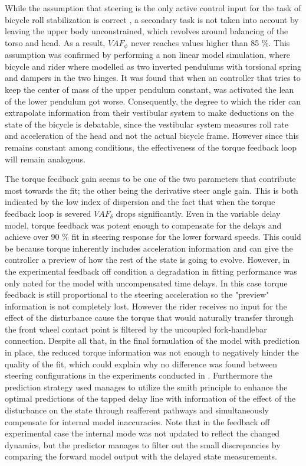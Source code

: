 While the assumption that steering is the only active control input for the task of bicycle roll stabilization is correct , a secondary task is not taken into account by leaving the upper body unconstrained, which revolves around balancing of the torso and head. As a result, \ensuremath{\mathit{VAF}_\phi} never reaches values higher than 85 \%. This assumption  was  confirmed by performing a non linear model simulation, where bicycle and rider where modelled as two inverted pendulums with torsional spring and dampers in the two hinges. It was found that when an  controller that tries to keep the center of mass of the upper pendulum constant, was activated the lean of the lower pendulum got worse. Consequently, the degree to which the rider can extrapolate information from their vestibular system to make deductions on the state of the bicycle is debatable, since the vestibular system measures roll rate and acceleration of the head and not the actual bicycle frame. However since this remains constant among conditions, the effectiveness of the torque feedback loop will remain analogous.

The torque feedback gain seems to be  one of the two  parameters that contribute most towards the fit; the other being the derivative steer angle gain. This is both indicated by the low index of dispersion and the fact that when the torque feedback loop is severed \ensuremath{\mathit{VAF}_\delta} drops significantly. Even in the variable delay model, torque feedback was potent enough to compensate for the delays and achieve over 90 \% fit in steering response for the lower forward speeds. This could be because torque inherently includes acceleration information and can give  the controller a preview of how the rest of the state is going to evolve. However, in the experimental feedback off condition a degradation in fitting performance was only noted for the model with uncompensated time delays. In this case torque feedback is still proportional to the steering acceleration so the "preview" information is not completely lost. However the rider receives no input for the effect of the disturbance cause the torque that would naturally transfer through the front wheel contact point is filtered by the uncoupled fork-handlebar connection.  Despite all that, in the final formulation of the model with prediction in place, the reduced torque information was not enough to negatively hinder the quality of the fit, which could explain why no difference was found between steering configurations in the experiments conducted in \cite{dialynaseffect}. Furthermore  the  prediction strategy used  manages to utilize the smith  principle to enhance the optimal  predictions of the tapped delay line with  information of the effect of the disturbance on the state through reafferent pathways and simultaneously compensate for internal model inaccuracies. Note that in the feedback off experimental case the internal mode was not updated to reflect the changed dynamics, but the predictor manages to filter out the small discrepancies by comparing the forward model output with the delayed state measurements.


